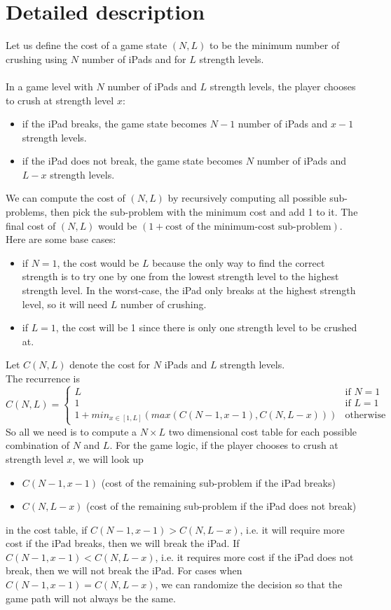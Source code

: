 \documentclass[12pt,a4paper,oneside]{report}
\begin{document}
\section{Detailed description}
Let us define the cost of a game state $(N, L)$ to be the minimum number of crushing using $N$ number of iPads and for $L$ strength levels. \\\\
In a game level with $N$ number of iPads and $L$ strength levels, the player chooses to crush at strength level $x$:
\begin{itemize}
\item if the iPad breaks, the game state becomes $N - 1$ number of iPads and $x - 1$ strength levels.
\item if the iPad does not break, the game state becomes $N$ number of iPads and $L - x$ strength levels.
\end{itemize}
We can compute the cost of $(N, L)$ by recursively computing all possible sub-problems, then pick the sub-problem with the minimum cost and add 1 to it. The final cost of $(N, L)$ would be $(1 + \text{cost of the minimum-cost sub-problem})$. Here are some base cases:
\begin{itemize}
\item if $N = 1$, the cost would be $L$ because the only way to find the correct strength is to try one by one from the lowest strength level to the highest strength level. In the worst-case, the iPad only breaks at the highest strength level, so it will need $L$ number of crushing.
\item if $L = 1$, the cost will be 1 since there is only one strength level to be crushed at.
\end{itemize}
Let $C(N, L)$ denote the cost for $N$ iPads and $L$ strength levels. \\
The recurrence is
\[
C(N, L) = 
\begin{cases}
L & \text{if $N = 1$} \\
1 & \text{if $L = 1$} \\
1 + min_{x \in [1, L]}(max(C(N - 1, x - 1), C(N, L - x))) & \text{otherwise}
\end{cases}
\]
So all we need is to compute a $N \times L$ two dimensional cost table for each possible combination of $N$ and $L$. For the game logic, if the player chooses to crush at strength level $x$, we will look up 
\begin{itemize}
\item $C(N - 1, x - 1)$ (cost of the remaining sub-problem if the iPad breaks)
\item $C(N, L - x)$ (cost of the remaining sub-problem if the iPad does not break)
\end{itemize}
in the cost table, if $C(N - 1, x - 1) > C(N, L - x)$, i.e. it will require more cost if the iPad breaks, then we will break the iPad. If $C(N - 1, x - 1) < C(N, L - x)$, i.e. it requires more cost if the iPad does not break, then we will not break the iPad. For cases when $C(N - 1, x - 1) = C(N, L - x)$, we can randomize the decision so that the game path will not always be the same.
\end{document}
